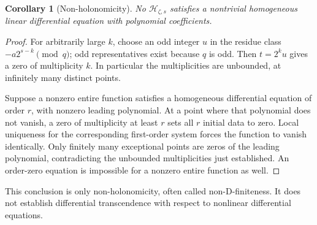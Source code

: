 \documentclass[11pt,a4paper,oneside,openany]{book}
\numberwithin{equation}{chapter}
\newtheorem{corollary}[theorem]{Corollary}
\theoremstyle{definition}
\theoremstyle{remark}
\newcommand{\Hp}{\mathcal H}
\begin{document}
\begin{corollary}[Non-holonomicity]
No \(\Hp_{\zeta,s}\) satisfies a nontrivial homogeneous linear differential equation with polynomial coefficients.
\end{corollary}
\begin{proof}
For arbitrarily large \(k\), choose an odd integer \(u\) in the residue class \(-a2^{s-k}\pmod q\); odd representatives exist because \(q\) is odd. Then \(t=2^ku\) gives a zero of multiplicity \(k\). In particular the multiplicities are unbounded, at infinitely many distinct points.

Suppose a nonzero entire function satisfies a homogeneous differential equation of order \(r\), with nonzero leading polynomial. At a point where that polynomial does not vanish, a zero of multiplicity at least \(r\) sets all \(r\) initial data to zero. Local uniqueness for the corresponding first-order system forces the function to vanish identically. Only finitely many exceptional points are zeros of the leading polynomial, contradicting the unbounded multiplicities just established. An order-zero equation is impossible for a nonzero entire function as well.
\end{proof}

This conclusion is only non-holonomicity, often called non-D-finiteness. It does not establish differential transcendence with respect to nonlinear differential equations.
\end{document}
